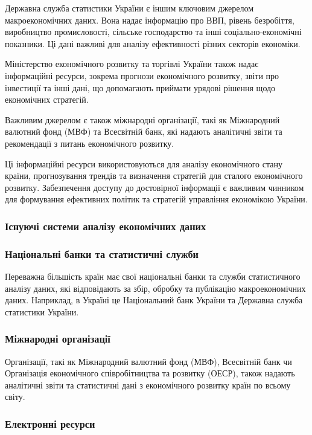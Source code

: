 Державна служба статистики України є іншим ключовим джерелом макроекономічних даних. Вона надає інформацію про ВВП, рівень безробіття, виробництво промисловості, сільське господарство та інші соціально-економічні показники. Ці дані важливі для аналізу ефективності різних секторів економіки.

Міністерство економічного розвитку та торгівлі України також надає інформаційні ресурси, зокрема прогнози економічного розвитку, звіти про інвестиції та інші дані, що допомагають приймати урядові рішення щодо економічних стратегій.

Важливим джерелом є також міжнародні організації, такі як Міжнародний валютний фонд (МВФ) та Всесвітній банк, які надають аналітичні звіти та рекомендації з питань економічного розвитку.

Ці інформаційні ресурси використовуються для аналізу економічного стану країни, прогнозування трендів та визначення стратегій для сталого економічного розвитку. Забезпечення доступу до достовірної інформації є важливим чинником для формування ефективних політик та стратегій управління економікою України.

\subsubsection{Існуючі системи аналізу економічних даних}

\subsubsection*{Національні банки та статистичні служби}

Переважна більшість країн має свої національні банки та служби статистичного аналізу даних, які відповідають за збір, обробку та публікацію макроекономічних даних. Наприклад, в Україні це Національний банк України та Державна служба статистики України.

\subsubsection*{Міжнародні організації}

Організації, такі як Міжнародний валютний фонд (МВФ), Всесвітній банк чи Організація економічного співробітництва та розвитку (ОЕСР), також надають аналітичні звіти та статистичні дані з економічного розвитку країн по всьому світу.

\subsubsection*{Електронні ресурси}

